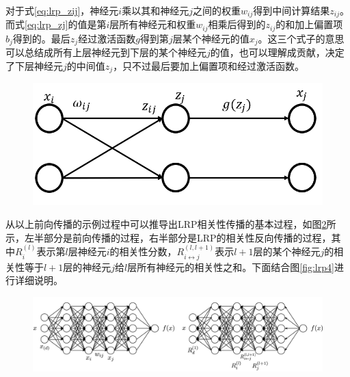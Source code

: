 对于式\ref{eq:lrp_zij}，神经元$i$乘以其和神经元$j$之间的权重$w_{ij}$得到中间计算结果$z_{ij}$。而式\ref{eq:lrp_zj}的值是第$i$层所有神经元和权重$w _{ij}$相乘后得到的$z_{ij}$的和加上偏置项$b_j$得到的。最后$z_j$经过激活函数$g$得到第$j$层某个神经元的值$x_j$。这三个式子的意思可以总结成所有上层神经元到下层的某个神经元$j$的值，也可以理解成贡献，决定了下层神经元$j$的中间值$z_j$，只不过最后要加上偏置项和经过激活函数。

\begin{figure}[h]
	\centering 
	\includegraphics[width=15cm]{fig/ch2/lrp2.png}
	\label{fig:lrp2}
\end{figure}



从以上前向传播的示例过程中可以推导出LRP相关性传播的基本过程，如图\ref{fig:lrp3}所示，左半部分是前向传播的过程，右半部分是LRP的相关性反向传播的过程，其中$R_i^{(l)}$表示第$l$层神经元$i$的相关性分数，$R_{i\leftrightarrow j}^{(l,l+1)}$表示$l+1$层的某个神经元$j$的相关性等于$l+1$层的神经元$j$给$l$层所有神经元的相关性之和。下面结合图\ref{fig:lrp4}进行详细说明。
\begin{figure}[h]
	\centering 
	\includegraphics[width=15cm]{fig/ch2/lrp3.png}
	\label{fig:lrp3}
\end{figure}


